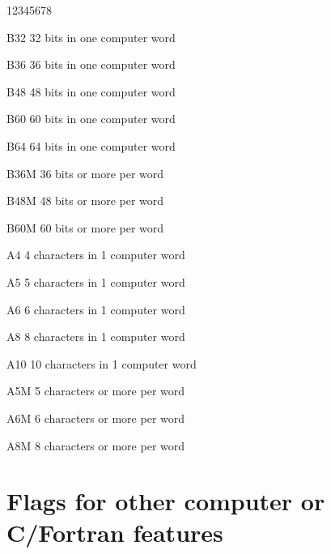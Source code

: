 \begin{DLtt}{12345678}
\item[B32]     32 bits in one computer word
\item[B36]     36 bits in one computer word
\item[B48]     48 bits in one computer word
\item[B60]     60 bits in one computer word
\item[B64]     64 bits in one computer word\\

\item[B36M]    36 bits  or  more per word
\item[B48M]    48 bits  or  more per word
\item[B60M]    60 bits  or  more per word\\

\item[A4]      4 characters in 1 computer word
\item[A5]      5 characters in 1 computer word
\item[A6]      6 characters in 1 computer word
\item[A8]      8 characters in 1 computer word
\item[A10]     10 characters in 1 computer word\\

\item[A5M]     5 characters  or  more per word
\item[A6M]     6 characters  or  more per word
\item[A8M]     8 characters  or  more per word\\
\end{DLtt}

\section{Flags for other computer or C/Fortran features}

